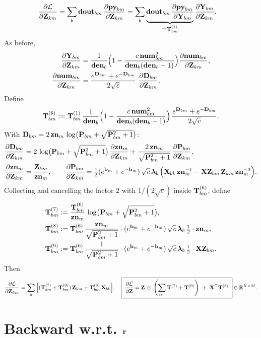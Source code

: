 \documentclass{article}
\begin{document}
\begin{align}
\ddfrac{\mathcal{L}}{\v{Z}{km}}
&= \sum_b \v{dout}{bm}\,\ddfrac{\v{py}{bm}}{\v{Z}{km}}
= \sum_b \underbrace{\v{dout}{bm}\,\ddfrac{\v{py}{bm}}{\v{Y}{bm}}}_{=\,\T{1}{bm}}\ddfrac{\v{Y}{bm}}{\v{Z}{km}}.
\end{align}
As before,
\begin{align}
\ddfrac{\v{Y}{bm}}{\v{Z}{km}}
&= \frac{1}{\v{den}{b}}\Big(1-\frac{c\,\v{num}{bm}^2}{\v{den}{b}(\v{den}{b}-1)}\Big)
\ddfrac{\v{num}{bm}}{\v{Z}{km}},\\
\ddfrac{\v{num}{bm}}{\v{Z}{km}}
&= \frac{\ev{D}{bm}+\ev{-D}{bm}}{2\sqrt{c}}\ \ddfrac{\v{D}{bm}}{\v{Z}{km}}.
\end{align}
Define
\[
\T{6}{bm}:= \T{1}{bm}\,\frac{1}{\v{den}{b}}\Big(1-\frac{c\,\v{num}{bm}^2}{\v{den}{b}(\v{den}{b}-1)}\Big)\,\frac{\ev{D}{bm}+\ev{-D}{bm}}{2\sqrt{c}}.
\]
With $\v{D}{bm}=2\,\v{zn}{m}\,\log\!\big(\v{P}{bm}+\sqrt{\v{P}{bm}^2+1}\big)$:
\begin{align}
\ddfrac{\v{D}{bm}}{\v{Z}{km}}
&= 2\,\log\!\big(\v{P}{bm}+\sqrt{\v{P}{bm}^2+1}\big)\,\ddfrac{\v{zn}{m}}{\v{Z}{km}}
+ \frac{2\,\v{zn}{m}}{\sqrt{\v{P}{bm}^2+1}}\,\ddfrac{\v{P}{bm}}{\v{Z}{km}},
\\
\ddfrac{\v{zn}{m}}{\v{Z}{km}} &= \frac{\v{Z}{km}}{\v{zn}{m}},\qquad
\ddfrac{\v{P}{bm}}{\v{Z}{km}}
= \tfrac12(\ev{b}{m}+\ev{-b}{m})\,\sqrt{c}\,\lam_b\,
\Big(\v{X}{bk}\,\v{zn}{m}^{-1} - \v{XZ}{bm}\,\v{Z}{km}\,\v{zn}{m}^{-3}\Big).
\end{align}
Collecting and cancelling the factor $2$ with $1/(2\sqrt{c})$ inside $\T{6}{bm}$, define
\begin{align}
\T{7}{bm} &:= \frac{\T{6}{bm}}{\v{zn}{m}}\,\log\!\big(\v{P}{bm}+\sqrt{\v{P}{bm}^2+1}\big),\\
\T{8}{bm} &:= \T{6}{bm}\,\frac{\v{zn}{m}}{\sqrt{\v{P}{bm}^2+1}}
\cdot (\ev{b}{m}+\ev{-b}{m})\,\sqrt{c}\,\lam_b\,\tfrac{1}{2}\cdot \v{zn}{m},\\
\T{9}{bm} &:= \T{6}{bm}\,\frac{1}{\sqrt{\v{P}{bm}^2+1}}
\cdot (\ev{b}{m}+\ev{-b}{m})\,\sqrt{c}\,\lam_b\,\tfrac{1}{2}\cdot \v{XZ}{bm}.
\end{align}
Then
\[
\ddfrac{\mathcal{L}}{\v{Z}{km}}
= \sum_b \Big[(\T{7}{bm}+\T{9}{bm})\,\v{Z}{km} + \T{8}{bm}\,\v{X}{bk}\Big],
\quad
\boxed{\ \ddfrac{\mathcal{L}}{\v{Z}} = \v{Z}\,\odot\,\colnorm{\T{7}+\T{9}}\ +\ \v{X}^\top \T{8}\ }\in\mathbb{R}^{K\times M}.
\]

\section{Backward w.r.t. $\v{r}$}
\end{document}
